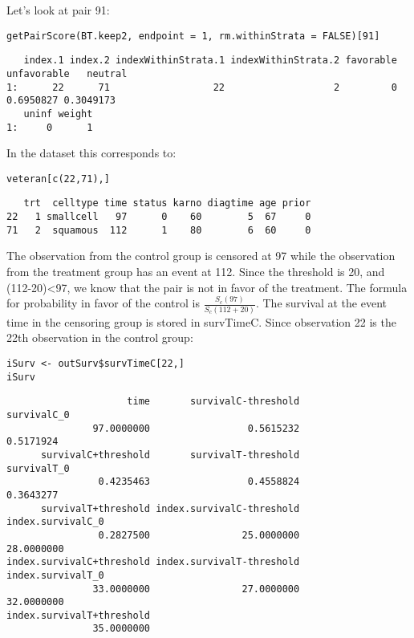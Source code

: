 \documentclass[12pt]{article}
\begin{document}
Let's look at pair 91:
\lstset{language=r,label= ,caption= ,captionpos=b,numbers=none}
\begin{lstlisting}
getPairScore(BT.keep2, endpoint = 1, rm.withinStrata = FALSE)[91]
\end{lstlisting}

\begin{verbatim}
   index.1 index.2 indexWithinStrata.1 indexWithinStrata.2 favorable unfavorable   neutral
1:      22      71                  22                   2         0   0.6950827 0.3049173
   uninf weight
1:     0      1
\end{verbatim}

In the dataset this corresponds to:
\lstset{language=r,label= ,caption= ,captionpos=b,numbers=none}
\begin{lstlisting}
veteran[c(22,71),]
\end{lstlisting}

\begin{verbatim}
   trt  celltype time status karno diagtime age prior
22   1 smallcell   97      0    60        5  67     0
71   2  squamous  112      1    80        6  60     0
\end{verbatim}

The observation from the control group is censored at 97 while the
observation from the treatment group has an event at 112. Since the
threshold is 20, and (112-20)<97, we know that the pair is not in
favor of the treatment. The formula for probability in favor of the
control is \(\frac{S_c(97)}{S_c(112+20)}\). The survival at the event
time in the censoring group is stored in survTimeC. Since observation
22 is the 22th observation in the control group:
\lstset{language=r,label= ,caption= ,captionpos=b,numbers=none}
\begin{lstlisting}
iSurv <- outSurv$survTimeC[22,] 
iSurv
\end{lstlisting}

\begin{verbatim}
                     time       survivalC-threshold               survivalC_0 
               97.0000000                 0.5615232                 0.5171924 
      survivalC+threshold       survivalT-threshold               survivalT_0 
                0.4235463                 0.4558824                 0.3643277 
      survivalT+threshold index.survivalC-threshold         index.survivalC_0 
                0.2827500                25.0000000                28.0000000 
index.survivalC+threshold index.survivalT-threshold         index.survivalT_0 
               33.0000000                27.0000000                32.0000000 
index.survivalT+threshold 
               35.0000000
\end{verbatim}
\end{document}
